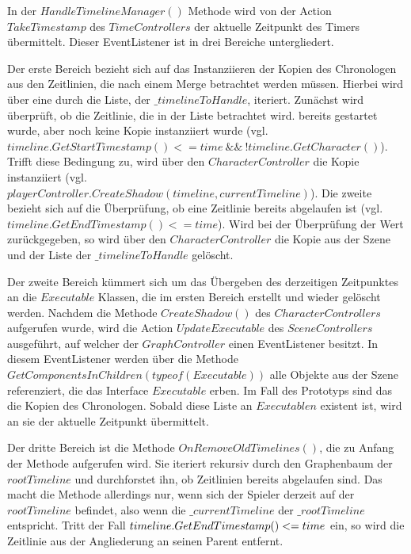 In der $HandleTimelineManager()$ Methode wird von der Action $TakeTimestamp$ des $TimeControllers$ der aktuelle Zeitpunkt des Timers übermittelt. Dieser EventListener ist in drei Bereiche untergliedert. 

Der erste Bereich bezieht sich auf das Instanziieren der Kopien des Chronologen aus den Zeitlinien, die nach einem Merge betrachtet werden müssen. Hierbei wird über eine  durch die Liste, der $\_timelineToHandle$, iteriert.
Zunächst wird überprüft, ob die Zeitlinie, die in der Liste betrachtet wird. bereits gestartet wurde, aber noch keine Kopie instanziiert wurde (vgl. $timeline.GetStartTimestamp() <= time ~\&\&~ !timeline.GetCharacter()$). Trifft diese Bedingung zu, wird über den $CharacterController$ die Kopie instanziiert (vgl.\\ $playerController.CreateShadow(timeline, currentTimeline)$). 
Die zweite  bezieht sich auf die Überprüfung, ob eine Zeitlinie bereits abgelaufen ist (vgl.\\$timeline.GetEndTimestamp() <= time$). Wird bei der Überprüfung der Wert  zurückgegeben, so wird über den $CharacterController$ die Kopie aus der Szene und der Liste der $\_timelineToHandle$ gelöscht.

Der zweite Bereich kümmert sich um das Übergeben des derzeitigen Zeitpunktes an die $Executable$ Klassen, die im ersten Bereich erstellt und wieder gelöscht werden. Nachdem die Methode $CreateShadow()$ des $CharacterControllers$ aufgerufen wurde, wird die Action $UpdateExecutable$ des $SceneControllers$ ausgeführt, auf welcher der $GraphController$ einen EventListener besitzt. In diesem EventListener werden über die Methode $GetComponentsInChildren(typeof(Executable))$ alle Objekte aus der Szene referenziert, die das Interface $Executable$ erben. Im Fall des Prototyps sind das die Kopien des Chronologen. Sobald diese Liste an $Executablen$ existent ist, wird an sie der aktuelle Zeitpunkt übermittelt.

Der dritte Bereich ist die Methode $OnRemoveOldTimelines()$, die zu Anfang der Methode aufgerufen wird. Sie iteriert rekursiv durch den Graphenbaum der $rootTimeline$ und durchforstet ihn, ob Zeitlinien bereits abgelaufen sind. Das macht die Methode allerdings nur, wenn sich der Spieler derzeit auf der $rootTimeline$ befindet, also wenn die $\_currentTimeline$ der $\_rootTimeline$ entspricht. Tritt der Fall $\\timeline.GetEndTimestamp() <= time$ ein, so wird die Zeitlinie aus der Angliederung an seinen Parent entfernt.

